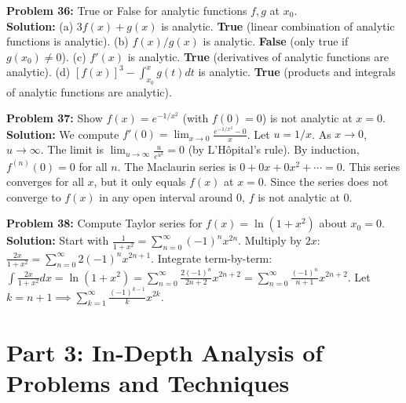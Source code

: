 \documentclass[11pt, letterpaper]{article}
\theoremstyle{definition}
\theoremstyle{remark}
\begin{document}
\textbf{Problem 36:} True or False for analytic functions $f, g$ at $x_0$.
\\[6pt]
\textbf{Solution:}
(a) $3f(x) + g(x)$ is analytic. \textbf{True} (linear combination of analytic functions is analytic).
(b) $f(x)/g(x)$ is analytic. \textbf{False} (only true if $g(x_0) \neq 0$).
(c) $f'(x)$ is analytic. \textbf{True} (derivatives of analytic functions are analytic).
(d) $[f(x)]^3 - \int_{x_0}^x g(t)dt$ is analytic. \textbf{True} (products and integrals of analytic functions are analytic).

\textbf{Problem 37:} Show $f(x) = e^{-1/x^2}$ (with $f(0)=0$) is not analytic at $x=0$.
\\[6pt]
\textbf{Solution:} We compute $f'(0) = \lim_{x \to 0} \frac{e^{-1/x^2} - 0}{x}$. Let $u = 1/x$. As $x \to 0$, $u \to \infty$. The limit is $\lim_{u \to \infty} \frac{u}{e^{u^2}} = 0$ (by L'H\^{o}pital's rule). By induction, $f^{(n)}(0) = 0$ for all $n$. The Maclaurin series is $0 + 0x + 0x^2 + \cdots = 0$. This series converges for all $x$, but it only equals $f(x)$ at $x=0$. Since the series does not converge to $f(x)$ in any open interval around $0$, $f$ is not analytic at $0$.

\textbf{Problem 38:} Compute Taylor series for $f(x) = \ln(1+x^2)$ about $x_0 = 0$.
\\[6pt]
\textbf{Solution:} Start with $\frac{1}{1+x^2} = \sum_{n=0}^{\infty} (-1)^n x^{2n}$.
Multiply by $2x$: $\frac{2x}{1+x^2} = \sum_{n=0}^{\infty} 2(-1)^n x^{2n+1}$.
Integrate term-by-term: $\int \frac{2x}{1+x^2} dx = \ln(1+x^2) = \sum_{n=0}^{\infty} \frac{2(-1)^n}{2n+2} x^{2n+2} = \sum_{n=0}^{\infty} \frac{(-1)^n}{n+1} x^{2n+2}$.
Let $k = n+1 \implies \sum_{k=1}^{\infty} \frac{(-1)^{k-1}}{k} x^{2k}$.

\newpage
\section{Part 3: In-Depth Analysis of Problems and Techniques}
\end{document}
